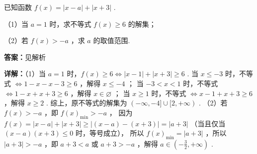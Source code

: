 \begin{question}[points=10]
已知函数 $f(x) = |x-a| + |x+3|$ .

（1）当 $a=1$ 时，求不等式 $f(x) \ge 6$ 的解集；

（2）若 $f(x) > -a$ ，求 $a$ 的取值范围.
\begin{solution}
\textbf{答案：}见解析

\textbf{详解：}（1）当 $a=1$ 时，$f(x) \ge 6 \iff |x-1| + |x+3| \ge 6$ .
当 $x \le -3$ 时，不等式 $\iff 1-x - x - 3 \ge 6$ ，解得 $x \le -4$ ；
当 $-3 < x < 1$ 时，不等式 $\iff 1-x + x + 3 \ge 6$ ，解得 $x \in \varnothing$ ；
当 $x \ge 1$ 时，不等式 $\iff x-1 + x+3 \ge 6$ ，解得 $x \ge 2$ .
综上，原不等式的解集为 $(-\infty, -4] \cup [2, +\infty)$ .
（2）若 $f(x) > -a$ ，即 $f(x)_{\min} > -a$ ，
因为 $f(x) = |x-a| + |x+3| \ge |(x-a) - (x+3)| = |a+3|$ （当且仅当 $(x-a)(x+3) \le 0$ 时，等号成立），
所以 $f(x)_{\min} = |a+3|$ ，所以 $|a+3| > -a$ ，即 $a+3 < a$ 或 $a+3 > -a$ ，解得 $a \in \left(-\frac{3}{2}, +\infty\right)$ .
\end{solution}
\end{question}

